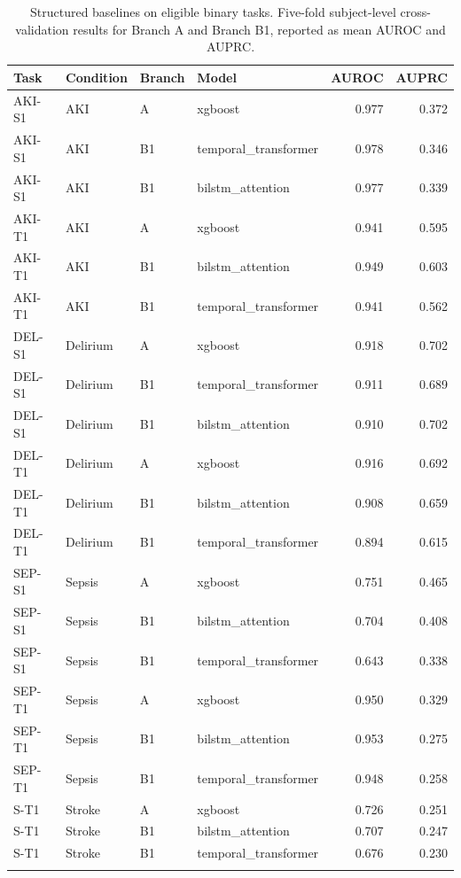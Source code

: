 \begin{table}[t]
\caption{Structured baselines on eligible binary tasks. Five-fold subject-level cross-validation results for Branch A and Branch B1, reported as mean AUROC and AUPRC.}
\label{tab:structured_baselines}
\centering
\scriptsize
\begin{tabular}{@{}llllrr@{}}
\toprule
Task & Condition & Branch & Model & AUROC & AUPRC \\
\midrule
AKI-S1 & AKI & A & xgboost & 0.977 & 0.372 \\
AKI-S1 & AKI & B1 & temporal\_transformer & 0.978 & 0.346 \\
AKI-S1 & AKI & B1 & bilstm\_attention & 0.977 & 0.339 \\
AKI-T1 & AKI & A & xgboost & 0.941 & 0.595 \\
AKI-T1 & AKI & B1 & bilstm\_attention & 0.949 & 0.603 \\
AKI-T1 & AKI & B1 & temporal\_transformer & 0.941 & 0.562 \\
DEL-S1 & Delirium & A & xgboost & 0.918 & 0.702 \\
DEL-S1 & Delirium & B1 & temporal\_transformer & 0.911 & 0.689 \\
DEL-S1 & Delirium & B1 & bilstm\_attention & 0.910 & 0.702 \\
DEL-T1 & Delirium & A & xgboost & 0.916 & 0.692 \\
DEL-T1 & Delirium & B1 & bilstm\_attention & 0.908 & 0.659 \\
DEL-T1 & Delirium & B1 & temporal\_transformer & 0.894 & 0.615 \\
SEP-S1 & Sepsis & A & xgboost & 0.751 & 0.465 \\
SEP-S1 & Sepsis & B1 & bilstm\_attention & 0.704 & 0.408 \\
SEP-S1 & Sepsis & B1 & temporal\_transformer & 0.643 & 0.338 \\
SEP-T1 & Sepsis & A & xgboost & 0.950 & 0.329 \\
SEP-T1 & Sepsis & B1 & bilstm\_attention & 0.953 & 0.275 \\
SEP-T1 & Sepsis & B1 & temporal\_transformer & 0.948 & 0.258 \\
S-T1 & Stroke & A & xgboost & 0.726 & 0.251 \\
S-T1 & Stroke & B1 & bilstm\_attention & 0.707 & 0.247 \\
S-T1 & Stroke & B1 & temporal\_transformer & 0.676 & 0.230 \\
\botrule
\end{tabular}
\normalsize
\end{table}
